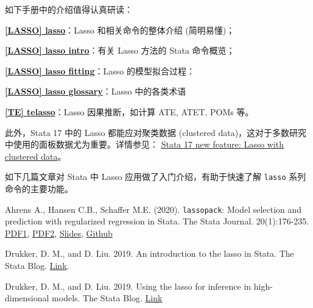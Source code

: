 {\vspace{6pt}
\noindent
如下手册中的介绍值得认真研读：

\vspace{5pt}
\href{https://www.stata.com/manuals/lassolasso.pdf}{\bfseries{[\MakeUppercase{lasso}] lasso}}：Lasso 和相关命令的整体介绍 (简明易懂)；

\href{https://www.stata.com/manuals/lassolasso intro.pdf}{\bfseries{[\MakeUppercase{lasso}] lasso intro}}：有关 Lasso 方法的 Stata 命令概览；  

\href{https://www.stata.com/manuals/lassolassofitting.pdf#lassolassofitting}{\bfseries{[\MakeUppercase{lasso}] lasso fitting}}：Lasso 的模型拟合过程：

\href{https://www.stata.com/manuals/lassolasso glossary.pdf}{\bfseries{[\MakeUppercase{lasso}] lasso glossary}}：Lasso 中的各类术语 

\href{https://www.stata.com/manuals/tetelasso.pdf}{\bfseries{[\MakeUppercase{te}] telasso}}：Lasso 因果推断，如计算 ATE, ATET, POMs 等。

\vspace{5pt}
此外，Stata 17 中的 Lasso 都能应对聚类数据 (clustered data)，这对于多数研究中使用的面板数据尤为重要。详情参见： \href{https://www.stata.com/new-in-stata/lasso-with-clustered-data/}{Stata 17 new feature: Lasso with clustered data}。

\vspace{5pt}
如下几篇文章对 Stata 中 Lasso 应用做了入门介绍，有助于快速了解 \texttt{lasso} 系列命令的主要功能。

Ahrens A., Hansen C.B., Schaffer M.E. (2020). \texttt{lassopack}: Model selection and prediction with regularized regression in Stata. The Stata Journal. 20(1):176-235. \href{https://arxiv.org/pdf/1901.05397.pdf}{PDF1}, \href{https://sci-hub.ren/10.1177/1536867X20909697}{PDF2}, \href{https://www.stata.com/meeting/uk18/}{Slides}, \href{https://statalasso.github.io/docs/lassopack/}{Github}

Drukker, D. M., and D. Liu. 2019. An introduction to the lasso in Stata. The Stata Blog.
\href{https://blog.stata.com/2019/09/09/an-introduction-to-the-lasso-in-stata/}{Link}.

Drukker, D. M., and D. Liu. 2019. Using the lasso for inference in high-dimensional models. The Stata Blog.
\href{https://blog.stata.com/2019/09/09/using-the-lasso-for-inference-in-high-dimensional-models/}{Link}

\iffalse %


}
